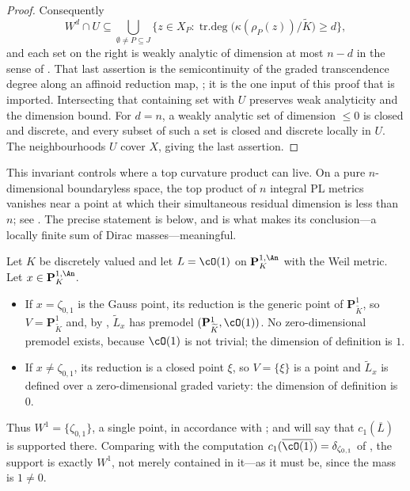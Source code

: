 \begin{proof}
Consequently
\[
 W^d\cap U\subseteq
 \bigcup_{\emptyset\ne P\subseteq J}
  \bigl\{z\in X_P:
   \operatorname{tr.deg}\bigl(\kappa(\rho_P(z))/\widetilde K\bigr)\ge d
  \bigr\},
\]
and each set on the right is weakly analytic of dimension at most $n-d$
in the sense of .  That last assertion is the
semicontinuity of the graded transcendence degree along an affinoid
reduction map, \cite[Proposition~11.10.4]{CLD25}; it is the one input of
this proof that is imported.  Intersecting that containing set with $U$
preserves weak analyticity and the dimension bound.  For $d=n$, a
weakly analytic set of dimension $\le0$ is closed and discrete, and
every subset of such a set is closed and discrete locally in $U$.
The neighbourhoods $U$ cover $X$, giving the last assertion.
\end{proof}

This invariant controls where a top curvature product can live.  On a pure
$n$-dimensional boundaryless space, the top product of $n$ integral PL
metrics vanishes near a point at which their simultaneous residual dimension
is less than $n$; see \cite[\S\S17.3--17.4, 18.4]{CLD25}.  The precise
statement is  below, and
 is what makes its conclusion---a locally
finite sum of Dirac masses---meaningful.

\begin{example}
\label{ex:ch17-dimdef-p1}
Let $K$ be discretely valued and let $L=\cO(1)$ on
$\mathbf P^{1,\An}_K$ with the Weil metric.  Let $x\in\mathbf P^{1,\An}_K$.
\begin{itemize}
\item If $x=\zeta_{0,1}$ is the Gauss point, its reduction is the generic
 point of $\mathbf P^1_{\widetilde K}$, so
 $V=\mathbf P^1_{\widetilde K}$ and, by
 , $\widetilde L_x$ has premodel
 $(\mathbf P^1_{\widetilde K},\cO(1))$.  No zero-dimensional premodel
 exists, because $\cO(1)$ is not trivial; the dimension of definition is
 $1$.
\item If $x\ne\zeta_{0,1}$, its reduction is a closed point $\xi$, so
 $V=\{\xi\}$ is a point and $\widetilde L_x$ is defined over a
 zero-dimensional graded variety: the dimension of definition is $0$.
\end{itemize}
Thus $W^1=\{\zeta_{0,1}\}$, a single point, in accordance with
; and
 will say that $c_1(\overline L)$ is
supported there.  Comparing with the computation
$c_1(\overline{\cO(1)})=\delta_{\zeta_{0,1}}$ of
, the support is exactly $W^1$, not merely
contained in it---as it must be, since the mass is $1\ne0$.
\end{example}

